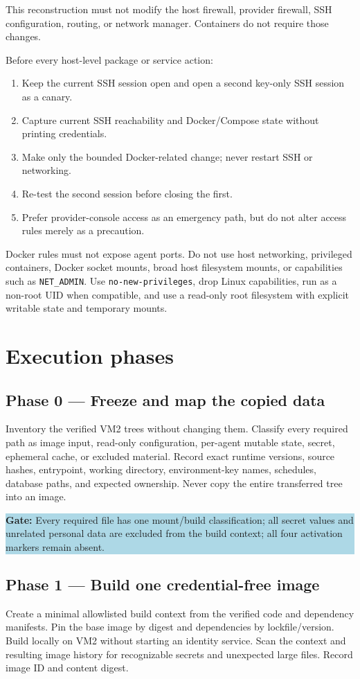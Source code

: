 \documentclass[11pt]{article}
\newcommand{\gate}[1]{\par\medskip\noindent\colorbox{lightblue}{\parbox{0.96\linewidth}{\textbf{Gate:} #1}}\par\medskip}
\begin{document}
This reconstruction must not modify the host firewall, provider firewall, SSH configuration, routing, or network manager. Containers do not require those changes.

Before every host-level package or service action:
\begin{enumerate}
\item Keep the current SSH session open and open a second key-only SSH session as a canary.
\item Capture current SSH reachability and Docker/Compose state without printing credentials.
\item Make only the bounded Docker-related change; never restart SSH or networking.
\item Re-test the second session before closing the first.
\item Prefer provider-console access as an emergency path, but do not alter access rules merely as a precaution.
\end{enumerate}

Docker rules must not expose agent ports. Do not use host networking, privileged containers, Docker socket mounts, broad host filesystem mounts, or capabilities such as \texttt{NET\_ADMIN}. Use \texttt{no-new-privileges}, drop Linux capabilities, run as a non-root UID when compatible, and use a read-only root filesystem with explicit writable state and temporary mounts.

\section*{Execution phases}

\subsection*{Phase 0 --- Freeze and map the copied data}
Inventory the verified VM2 trees without changing them. Classify every required path as image input, read-only configuration, per-agent mutable state, secret, ephemeral cache, or excluded material. Record exact runtime versions, source hashes, entrypoint, working directory, environment-key names, schedules, database paths, and expected ownership. Never copy the entire transferred tree into an image.

\gate{Every required file has one mount/build classification; all secret values and unrelated personal data are excluded from the build context; all four activation markers remain absent.}

\subsection*{Phase 1 --- Build one credential-free image}
Create a minimal allowlisted build context from the verified code and dependency manifests. Pin the base image by digest and dependencies by lockfile/version. Build locally on VM2 without starting an identity service. Scan the context and resulting image history for recognizable secrets and unexpected large files. Record image ID and content digest.
\end{document}
